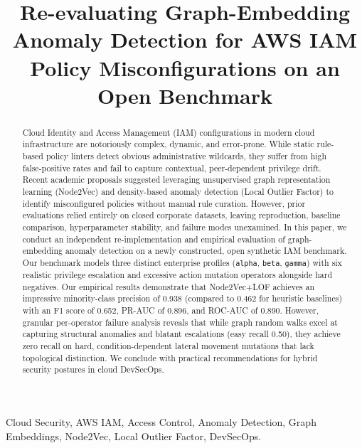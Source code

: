 \documentclass[conference]{IEEEtran}
\begin{document}
\title{Re-evaluating Graph-Embedding Anomaly Detection for AWS IAM Policy Misconfigurations on an Open Benchmark}

\author{
}

\maketitle

\begin{abstract}
Cloud Identity and Access Management (IAM) configurations in modern cloud infrastructure are notoriously complex, dynamic, and error-prone. While static rule-based policy linters detect obvious administrative wildcards, they suffer from high false-positive rates and fail to capture contextual, peer-dependent privilege drift. Recent academic proposals suggested leveraging unsupervised graph representation learning (Node2Vec) and density-based anomaly detection (Local Outlier Factor) to identify misconfigured policies without manual rule curation. However, prior evaluations relied entirely on closed corporate datasets, leaving reproduction, baseline comparison, hyperparameter stability, and failure modes unexamined. In this paper, we conduct an independent re-implementation and empirical evaluation of graph-embedding anomaly detection on a newly constructed, open synthetic IAM benchmark. Our benchmark models three distinct enterprise profiles (\texttt{alpha}, \texttt{beta}, \texttt{gamma}) with six realistic privilege escalation and excessive action mutation operators alongside hard negatives. Our empirical results demonstrate that Node2Vec+LOF achieves an impressive minority-class precision of 0.938 (compared to 0.462 for heuristic baselines) with an F1 score of 0.652, PR-AUC of 0.896, and ROC-AUC of 0.890. However, granular per-operator failure analysis reveals that while graph random walks excel at capturing structural anomalies and blatant escalations (easy recall 0.50), they achieve zero recall on hard, condition-dependent lateral movement mutations that lack topological distinction. We conclude with practical recommendations for hybrid security postures in cloud DevSecOps.
\end{abstract}

\begin{IEEEkeywords}
Cloud Security, AWS IAM, Access Control, Anomaly Detection, Graph Embeddings, Node2Vec, Local Outlier Factor, DevSecOps.
\end{IEEEkeywords}













\end{document}
